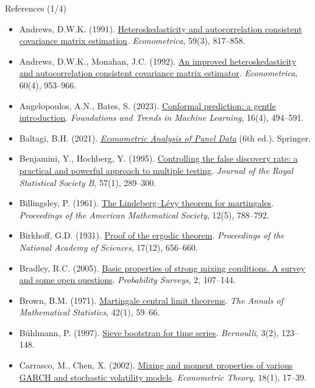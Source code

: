 \begin{frame}{References (1/4)}
\itemsize{\tiny}
\begin{itemize}
    \item Andrews, D.W.K. (1991). \href{https://doi.org/10.2307/2938229}{Heteroskedasticity and autocorrelation consistent covariance matrix estimation}. \emph{Econometrica}, 59(3), 817--858.
    \item Andrews, D.W.K., Monahan, J.C. (1992). \href{https://doi.org/10.2307/2951574}{An improved heteroskedasticity and autocorrelation consistent covariance matrix estimator}. \emph{Econometrica}, 60(4), 953--966.
    \item Angelopoulos, A.N., Bates, S. (2023). \href{https://doi.org/10.1561/2200000101}{Conformal prediction: a gentle introduction}. \emph{Foundations and Trends in Machine Learning}, 16(4), 494--591.
    \item Baltagi, B.H. (2021). \href{https://doi.org/10.1007/978-3-030-53953-5}{\emph{Econometric Analysis of Panel Data}} (6th ed.). Springer.
    \item Benjamini, Y., Hochberg, Y. (1995). \href{https://doi.org/10.1111/j.2517-6161.1995.tb02031.x}{Controlling the false discovery rate: a practical and powerful approach to multiple testing}. \emph{Journal of the Royal Statistical Society B}, 57(1), 289--300.
    \item Billingsley, P. (1961). \href{https://doi.org/10.1090/S0002-9939-1961-0126871-X}{The Lindeberg--Lévy theorem for martingales}. \emph{Proceedings of the American Mathematical Society}, 12(5), 788--792.
    \item Birkhoff, G.D. (1931). \href{https://doi.org/10.1073/pnas.17.2.656}{Proof of the ergodic theorem}. \emph{Proceedings of the National Academy of Sciences}, 17(12), 656--660.
    \item Bradley, R.C. (2005). \href{https://doi.org/10.1214/154957805100000104}{Basic properties of strong mixing conditions. A survey and some open questions}. \emph{Probability Surveys}, 2, 107--144.
    \item Brown, B.M. (1971). \href{https://doi.org/10.1214/aoms/1177693494}{Martingale central limit theorems}. \emph{The Annals of Mathematical Statistics}, 42(1), 59--66.
    \item Bühlmann, P. (1997). \href{https://doi.org/10.2307/3318584}{Sieve bootstrap for time series}. \emph{Bernoulli}, 3(2), 123--148.
    \item Carrasco, M., Chen, X. (2002). \href{https://doi.org/10.1017/S0266466602181023}{Mixing and moment properties of various GARCH and stochastic volatility models}. \emph{Econometric Theory}, 18(1), 17--39.

\end{itemize}
\end{frame}
